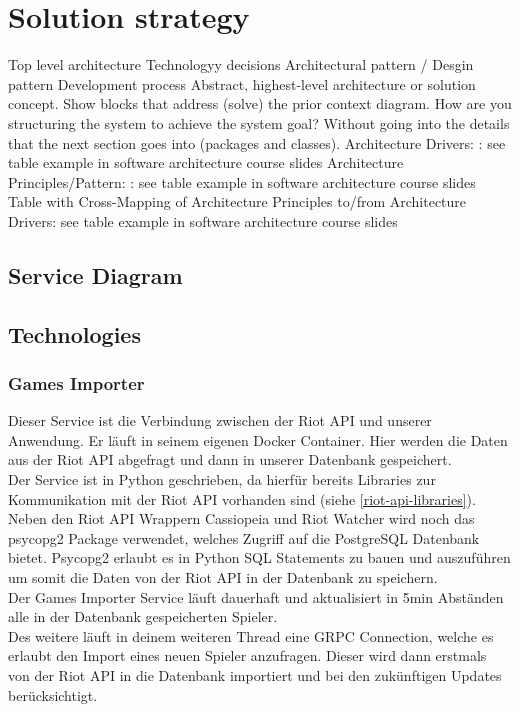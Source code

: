 \section{Solution strategy}
Top level architecture
Technologyy decisions
Architectural pattern / Desgin pattern
Development process
Abstract, highest-level architecture or solution concept. Show blocks that address (solve) the prior context diagram. How are you structuring the system to achieve the system goal? Without going into the details that the next section goes into (packages and classes).
Architecture Drivers: : see table example in software architecture course slides
Architecture Principles/Pattern: : see table example in software architecture course slides
Table with Cross-Mapping of Architecture Principles to/from Architecture Drivers: see table example in software architecture course slides

\subsection{Service Diagram}

\subsection{Technologies}

\subsubsection{Games Importer}
Dieser Service ist die Verbindung zwischen der Riot API und unserer Anwendung. Er läuft in seinem eigenen Docker Container. Hier werden die Daten aus der Riot API abgefragt und dann in unserer Datenbank gespeichert.\\
Der Service ist in Python geschrieben, da hierfür bereits Libraries zur Kommunikation mit der Riot API vorhanden sind (siehe \ref{riot-api-libraries}).\\
Neben den Riot API Wrappern Cassiopeia und Riot Watcher wird noch das psycopg2 Package verwendet, welches Zugriff auf die PostgreSQL Datenbank bietet. Psycopg2 erlaubt es in Python SQL Statements zu bauen und auszuführen um somit die Daten von der Riot API in der Datenbank zu speichern.\\
Der Games Importer Service läuft dauerhaft und aktualisiert in 5min Abständen alle in der Datenbank gespeicherten Spieler. \\
Des weitere läuft in deinem weiteren Thread eine GRPC Connection, welche es erlaubt den Import eines neuen Spieler anzufragen. Dieser wird dann erstmals von der Riot API in die Datenbank importiert und bei den zukünftigen Updates berücksichtigt.

